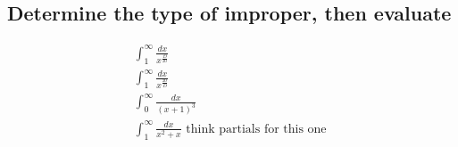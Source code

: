 \documentclass[a4paper]{article}
\begin{document}
\subsection{Determine the type of improper, then evaluate}%
\label{sub:Determine the type of improper, then evaluate}
\begin{gather}
\int_{1}^{\infty} \frac{dx}{x^{\frac{19}{20}}} \\
\int_{1}^{\infty} \frac{dx}{x^{\frac{20}{19}}} \\
\int_{0}^{\infty} \frac{dx}{\left(x+1\right)^3} \\
\int_{1}^{\infty} \frac{dx}{x^2+x} \text{ think partials for this one }
\end{gather}
\end{document}
